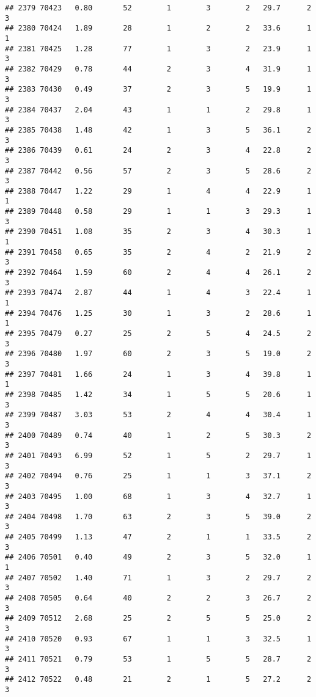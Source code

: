 \documentclass[
]{article}
\begin{document}
\begin{verbatim}
## 2379 70423   0.80       52        1        3        2   29.7      2      3
## 2380 70424   1.89       28        1        2        2   33.6      1      1
## 2381 70425   1.28       77        1        3        2   23.9      1      3
## 2382 70429   0.78       44        2        3        4   31.9      1      3
## 2383 70430   0.49       37        2        3        5   19.9      1      3
## 2384 70437   2.04       43        1        1        2   29.8      1      3
## 2385 70438   1.48       42        1        3        5   36.1      2      3
## 2386 70439   0.61       24        2        3        4   22.8      2      3
## 2387 70442   0.56       57        2        3        5   28.6      2      3
## 2388 70447   1.22       29        1        4        4   22.9      1      1
## 2389 70448   0.58       29        1        1        3   29.3      1      3
## 2390 70451   1.08       35        2        3        4   30.3      1      1
## 2391 70458   0.65       35        2        4        2   21.9      2      3
## 2392 70464   1.59       60        2        4        4   26.1      2      3
## 2393 70474   2.87       44        1        4        3   22.4      1      1
## 2394 70476   1.25       30        1        3        2   28.6      1      1
## 2395 70479   0.27       25        2        5        4   24.5      2      3
## 2396 70480   1.97       60        2        3        5   19.0      2      3
## 2397 70481   1.66       24        1        3        4   39.8      1      1
## 2398 70485   1.42       34        1        5        5   20.6      1      3
## 2399 70487   3.03       53        2        4        4   30.4      1      3
## 2400 70489   0.74       40        1        2        5   30.3      2      3
## 2401 70493   6.99       52        1        5        2   29.7      1      3
## 2402 70494   0.76       25        1        1        3   37.1      2      3
## 2403 70495   1.00       68        1        3        4   32.7      1      3
## 2404 70498   1.70       63        2        3        5   39.0      2      3
## 2405 70499   1.13       47        2        1        1   33.5      2      3
## 2406 70501   0.40       49        2        3        5   32.0      1      1
## 2407 70502   1.40       71        1        3        2   29.7      2      3
## 2408 70505   0.64       40        2        2        3   26.7      2      3
## 2409 70512   2.68       25        2        5        5   25.0      2      3
## 2410 70520   0.93       67        1        1        3   32.5      1      3
## 2411 70521   0.79       53        1        5        5   28.7      2      3
## 2412 70522   0.48       21        2        1        5   27.2      2      3

\end{verbatim}
\end{document}
